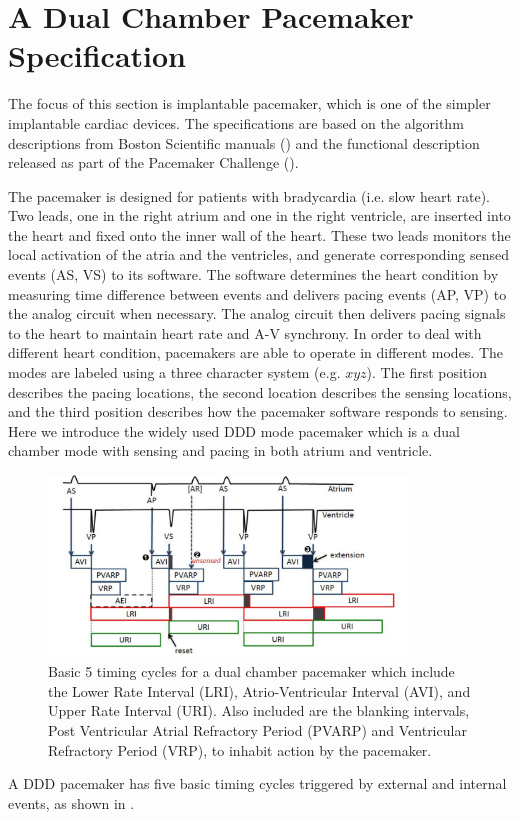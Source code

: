 \section{A Dual Chamber Pacemaker Specification}
The focus of this section is implantable pacemaker, which is one of the simpler implantable cardiac devices.
The specifications are based on the algorithm descriptions from Boston Scientific manuals (\cite{compass}) and the functional description released as part of the Pacemaker Challenge (\cite{challenge}). 


The pacemaker is designed for patients with bradycardia (i.e. slow heart rate). 
Two leads, one in the right atrium and one in the right ventricle, are inserted into the heart and fixed onto the inner wall of the heart. 
These two leads monitors the local activation of the atria and the ventricles, and generate corresponding sensed events \textsf{(AS, VS)} to its software. 
The software determines the heart condition by measuring time difference between events and delivers pacing events \textsf{(AP, VP)} to the analog circuit when necessary. 
The analog circuit then delivers pacing signals to the heart to maintain heart rate and A-V synchrony. 
In order to deal with different heart condition, pacemakers are able to operate in different modes. 
The modes are labeled using a three character system (e.g. $xyz$). 
The first position describes the pacing locations, the second location describes the sensing locations, and the third position describes how the pacemaker software responds to sensing. 
Here we introduce the widely used DDD mode pacemaker which is a dual chamber mode with sensing and pacing in both atrium and ventricle. 

\begin{figure}[!b]
\center
\includegraphics[width=0.85\textwidth]{figs/PM_timers.pdf}
\caption{Basic 5 timing cycles for a dual chamber pacemaker which include the Lower Rate Interval (LRI),  Atrio-Ventricular Interval (AVI), and Upper Rate Interval (URI). Also included are the blanking intervals, Post Ventricular Atrial Refractory Period (PVARP) and Ventricular Refractory Period (VRP), to inhabit action by the pacemaker.}
\label{fig:PMtimers}

\end{figure} 
A DDD pacemaker has five basic timing cycles triggered by external and internal events, as shown in . 

